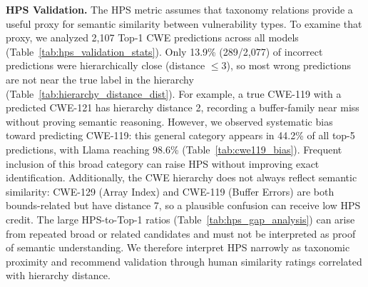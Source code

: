 \documentclass[lettersize,journal]{IEEEtran}
\begin{document}
\begin{table}[!t]
\centering%
\caption{Top-8 misclassification patterns showing CWE-119 as a semantic magnet in PBD and CWE-416 confusion dominance in LFD. Counts are averaged across three runs.}
\label{tab:misclassification}
\small
\renewcommand{\arraystretch}{1.1}
\end{table}

\textbf{HPS Validation.}
The \gls{HPS} metric assumes that taxonomy relations provide a useful proxy for semantic similarity between vulnerability types. To examine that proxy, we analyzed 2,107 Top-1 CWE predictions across all models (Table~\ref{tab:hps_validation_stats}). Only 13.9\% (289/2,077) of incorrect predictions were hierarchically close (distance $\leq$3), so most wrong predictions are not near the true label in the hierarchy (Table~\ref{tab:hierarchy_distance_dist}). For example, a true CWE-119 with a predicted CWE-121 has hierarchy distance 2, recording a buffer-family near miss without proving semantic reasoning.
However, we observed systematic bias toward predicting CWE-119: this general category appears in 44.2\% of all top-5 predictions, with Llama reaching 98.6\% (Table~\ref{tab:cwe119_bias}).
Frequent inclusion of this broad category can raise \gls{HPS} without improving exact identification.
Additionally, the CWE hierarchy does not always reflect semantic similarity: CWE-129 (Array Index) and CWE-119 (Buffer Errors) are both bounds-related but have distance 7, so a plausible confusion can receive low \gls{HPS} credit. The large HPS-to-Top-1 ratios (Table~\ref{tab:hps_gap_analysis}) can arise from repeated broad or related candidates and must not be interpreted as proof of semantic understanding. We therefore interpret \gls{HPS} narrowly as taxonomic proximity and recommend validation through human similarity ratings correlated with hierarchy distance.
\end{document}
